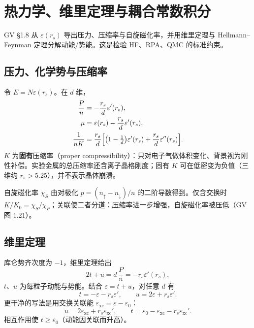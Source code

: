 \section{热力学、维里定理与耦合常数积分}

GV §1.8 从 $\varepsilon(r_s)$ 导出压力、压缩率与自旋磁化率，并用维里定理与 Hellmann--Feynman 定理分解动能/势能。这是检验 HF、RPA、QMC 的标准约束。

\subsection{压力、化学势与压缩率}

令 $E=N\varepsilon(r_s)$。在 $d$ 维，
\begin{equation}
\begin{aligned}
  \frac{P}{n}
  &=-\frac{r_s}{d}\varepsilon'(r_s),\\
  \mu
  &=\varepsilon(r_s)-\frac{r_s}{d}\varepsilon'(r_s),\\
  \frac{1}{nK}
  &=\frac{r_s}{d}
  \Bigl[
  \bigl(1-\tfrac{1}{d}\bigr)\varepsilon'(r_s)
  +\frac{r_s}{d}\varepsilon''(r_s)
  \Bigr].
\end{aligned}
\label{eq:PK}
\end{equation}
$K$ 为\textbf{固有}压缩率（proper compressibility）：只对电子气做体积变化、背景视为刚性补偿。实验金属的总压缩率还含离子晶格刚度；固有 $K$ 可在低密变为负值（三维约 $r_s>5.25$），并不表示晶体崩溃。

自旋磁化率 $\chi_S$ 由对极化 $p=(n_\uparrow-n_\downarrow)/n$ 的二阶导数得到。仅含交换时 $K/K_0=\chi_S/\chi_P$；关联使二者分道：压缩率进一步增强，自旋磁化率被压低（GV 图 1.21）。

\subsection{维里定理}

库仑势齐次度为 $-1$，维里定理给出
\begin{equation}
  2t+u
  =d\,\frac{P}{n}
  =-r_s\varepsilon'(r_s),
\label{eq:virial}
\end{equation}
$t$、$u$ 为每粒子动能与势能。结合 $\varepsilon=t+u$，对任意 $d$ 有
\begin{equation}
  t=-\varepsilon-r_s\varepsilon',
  \qquad
  u=2\varepsilon+r_s\varepsilon'.
\end{equation}
更干净的写法是用交换关联能 $\varepsilon_{\mathrm{xc}}=\varepsilon-\varepsilon_0$：
\begin{equation}
  u=2\varepsilon_{\mathrm{xc}}+r_s\varepsilon_{\mathrm{xc}}',
  \qquad
  t=\varepsilon_0-\varepsilon_{\mathrm{xc}}-r_s\varepsilon_{\mathrm{xc}}'.
\end{equation}
相互作用使 $t\ge\varepsilon_0$（动能因关联而升高）。

